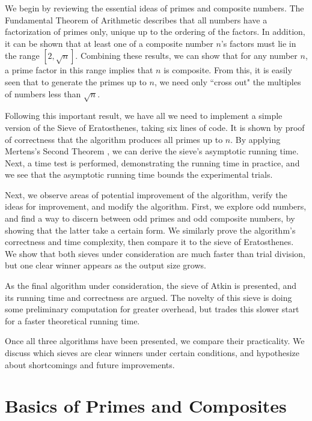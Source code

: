 \documentclass{amsart}
\theoremstyle{definition}
\theoremstyle{case}
\begin{document}
    We begin by reviewing the essential ideas of primes and composite numbers. The Fundamental Theorem of Arithmetic describes that all numbers have a factorization of primes only, unique up to the ordering of the factors. In addition, it can be shown that at least one of a composite number $n$'s factors must lie in the range $[2, \sqrt{n}]$. Combining these results, we can show that for any number $n$, a prime factor in this range implies that $n$ is composite. From this, it is easily seen that to generate the primes up to $n$, we need only ``cross out" the multiples of numbers less than $\sqrt{n}$.
    
    Following this important result, we have all we need to implement a simple version of the Sieve of Eratosthenes, taking six lines of code. It is shown by proof of correctness that the algorithm produces all primes up to $n$. By applying Mertens's Second Theorem \cite{mertens}, we can derive the sieve's asymptotic running time. Next, a time test is performed, demonstrating the running time in practice, and we see that the asymptotic running time bounds the experimental trials.
    
    Next, we observe areas of potential improvement of the algorithm, verify the ideas for improvement, and modify the algorithm. First, we explore odd numbers, and find a way to discern between odd primes and odd composite numbers, by showing that the latter take a certain form. We similarly prove the algorithm's correctness and time complexity, then compare it to the sieve of Eratosthenes. We show that both sieves under consideration are much faster than trial division, but one clear winner appears as the output size grows.
    
    As the final algorithm under consideration, the sieve of Atkin is presented, and its running time and correctness are argued. The novelty of this sieve is doing some preliminary computation for greater overhead, but trades this slower start for a faster theoretical running time.
    
    Once all three algorithms have been presented, we compare their practicality. We discuss which sieves are clear winners under certain conditions, and hypothesize about shortcomings and future improvements.
    
    
    \section{Basics of Primes and Composites}
    
\end{document}
